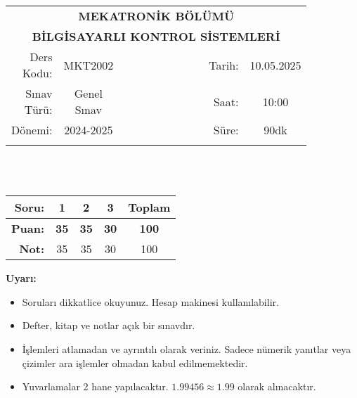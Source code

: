 \newcommand\UniversiteAdi{Niğde Ömer Halisdemir Üniversitesi}
\newcommand\BolumAdi{MEKATRONİK BÖLÜMÜ}
\newcommand\DersKodu{MKT2002}
\newcommand\DersAdi{BİLGİSAYARLI KONTROL SİSTEMLERİ}
\newcommand\SinavAdi{Genel Sınav}
\newcommand\SinavTarihi{10.05.2025}
\newcommand\SinavSaati{10:00}
\newcommand\SinavSuresi{90dk}

\pagestyle{fancy}
\fancyhf{} %
\noindent
\begin{tabular}{
    p{0.15\linewidth}
    p{0.15\linewidth}
    p{0.3\linewidth}
    p{0.1\linewidth}
    p{0.15\linewidth}}
    \multicolumn{5}{c}{\textbf{\BolumAdi}}\\
    \multicolumn{5}{c}{\textbf{\DersAdi}}\\\hline
    \multicolumn{1}{|r|}{Ders Kodu:}&
    \multicolumn{1}{|c|}{\DersKodu}&
    \multicolumn{1}{|c|}{}& 
    \multicolumn{1}{|r|}{Tarih:}&
    \multicolumn{1}{|c|}{\SinavTarihi} \\\hline
    \multicolumn{1}{|r|}{Sınav Türü:}&
    \multicolumn{1}{|c|}{\SinavAdi}&  
    \multicolumn{1}{|c|}{}&
    \multicolumn{1}{|r|}{Saat:}&
    \multicolumn{1}{|c|}{\SinavSaati}\\\hline
    \multicolumn{1}{|r|}{Dönemi:}&
    \multicolumn{1}{|c|}{2024-2025}&
    \multicolumn{1}{|c|}{}&
    \multicolumn{1}{|r|}{Süre:}&
    \multicolumn{1}{|c|}{\SinavSuresi} \\\hline
    &&&&\\
\end{tabular}\\\\
\noindent\begin{center}
\begin{tabular}{|r|c|c|c|c|}\hline
    \textbf{Soru:}&
    \textbf{1}&
    \textbf{2}&
    \textbf{3}&
    \textbf{Toplam}\\\hline
    \textbf{Puan:}&
    \textbf{35}&
    \textbf{35}&
    \textbf{30}&
    \textbf{100}\\\hline
    \textbf{Not:}&35&35&30&100\\\hline
\end{tabular}\end{center}
\noindent\textbf{Uyarı:}
\begin{itemize}\bfseries
    \item Soruları dikkatlice okuyunuz. Hesap makinesi kullanılabilir.
    \item Defter, kitap ve notlar açık bir sınavdır.
    \item İşlemleri atlamadan ve ayrıntılı olarak veriniz. Sadece nümerik yanıtlar veya çizimler ara işlemler olmadan kabul edilmemektedir.
    \item Yuvarlamalar 2 hane yapılacaktır. $\mathbf{1.99456\approx1.99}$ olarak alınacaktır.
\end{itemize}

